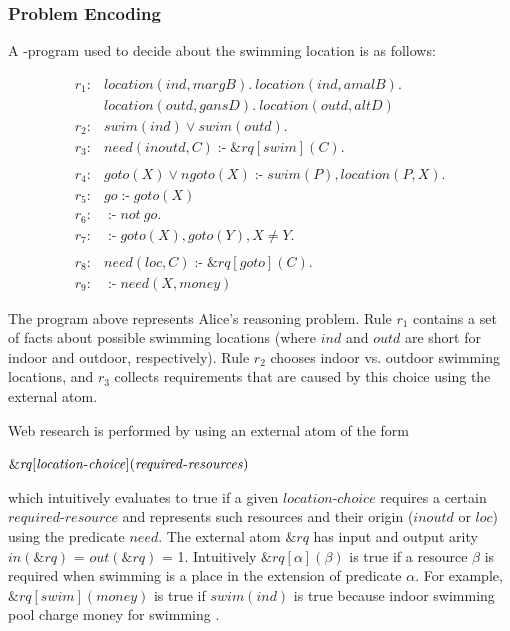 \documentclass[a4paper, titlepage]{article}
\newcommand{\ext}[3]{\ensuremath{\&{#1}[#2](#3)}}
\DeclareMathOperator{\leftimpl}{:-}
\begin{document}
\subsubsection{Problem Encoding}
A \hex-program used to decide about the swimming location is as 
follows:
\begin{exmp}
\label{swimExample}
\begin{align*}
r_1\colon& location(ind, margB). \ location(ind, amalB). \ \\& 
location(outd, gansD). \ location(outd, altD) \\  
r_2\colon& swim(ind) \vee swim(outd).\\ 
r_3\colon& need(inoutd, C) \leftimpl \ext{\mathit{rq}}
{\mathit{swim}}{\mathit{C}}. \\
\\
r_4\colon& goto(X) \vee ngoto(X) \leftimpl swim(P), 
location(P, X).\\
r_5\colon& go \leftimpl goto(X)\\
r_6\colon& \leftimpl not \ go. \\
r_7\colon& \leftimpl goto(X), goto(Y), X \neq Y. \\
\\
r_8\colon& \mathit{need}(loc, C) \leftimpl 
\ext{\mathit{rq}}{\mathit{goto}}{\mathit{C}}. \\ 
r_9\colon& \leftimpl need(X, money)
\end{align*}
\end{exmp}
The \hex{} program above represents Alice's reasoning 
problem. Rule $r_1$ contains a set of facts about possible 
swimming locations (where $\mathit{ind}$ and 
$\mathit{outd}$ are short for indoor and outdoor, 
respectively). Rule $r_2$ chooses indoor vs. outdoor 
swimming locations, and $r_3$ collects requirements that 
are caused by this choice using the external atom. 

Web research is performed by using an external atom of the 
form 
\\ \centerline{$\ext{\mathit{rq}}{\mathit{location}$-$
\mathit{choice}}{\mathit{required}$-$\mathit{resources}}$}
which intuitively 
evaluates to true if a given $\mathit{location}$-$\mathit{choice}$ 
requires a certain $\mathit{required}$-$\mathit{resource}$ and 
represents such resources  and their origin 
($\mathit{inoutd}$ or $\mathit{loc}$) using the predicate 
$\mathit{need}$. The external atom $\mathit{\&rq}$ has 
input and output arity $\mathit{in(\&rq)}$ = 
$\mathit{out(\&rq)}$ = 1. Intuitively  $\ext{\mathit{rq}}
{\mathit{\alpha}}{\mathit{\beta}}$ is true if a resource 
$\beta$ is required when swimming is a place in the 
extension of predicate $\alpha$. For example, 
$\ext{\mathit{rq}}{\mathit{swim}}{\mathit{money}}$ is true 
if $\mathit{swim(ind)}$ is true because indoor swimming 
pool charge money for swimming \cite{swim}. 
\end{document}

